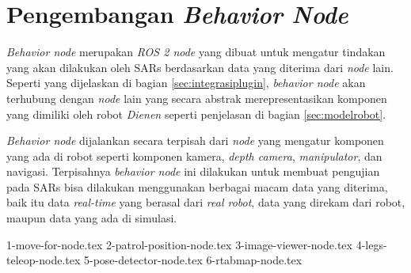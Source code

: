 \section{Pengembangan \emph{Behavior Node}}
\label{sec:behaviornode}

\emph{Behavior node} merupakan \emph{ROS 2 node} yang dibuat untuk mengatur tindakan yang akan dilakukan oleh SARs berdasarkan data yang diterima dari \emph{node} lain.
Seperti yang dijelaskan di bagian \ref{sec:integrasiplugin},
  \emph{behavior node} akan terhubung dengan \emph{node} lain yang secara abstrak merepresentasikan komponen yang dimiliki oleh robot \emph{Dienen} seperti penjelasan di bagian \ref{sec:modelrobot}.

\emph{Behavior node} dijalankan secara terpisah dari \emph{node} yang mengatur komponen yang ada di robot seperti komponen kamera, \emph{depth camera}, \emph{manipulator}, dan navigasi.
Terpisahnya \emph{behavior node} ini dilakukan untuk membuat pengujian pada SARs bisa dilakukan menggunakan berbagai macam data yang diterima,
  baik itu data \emph{real-time} yang berasal dari \emph{real robot},
  data yang direkam dari robot,
  maupun data yang ada di simulasi.

{1-move-for-node.tex}
{2-patrol-position-node.tex}
{3-image-viewer-node.tex}
{4-legs-teleop-node.tex}
{5-pose-detector-node.tex}
{6-rtabmap-node.tex}
